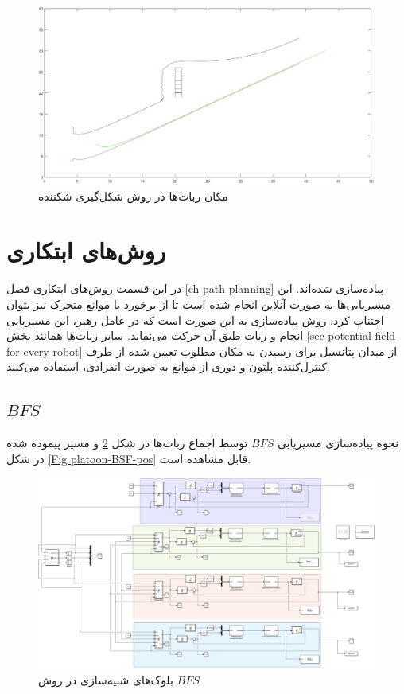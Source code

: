 \begin{figure}[!h]
	\centering
	\includegraphics[scale=0.2]{Images/platoon-potential-field-independent-pos.jpg}
	\caption{مکان ربات‌ها در روش شکل‌گیری شکننده}\label{Fig platoon-potential-field-independent-pos}
\end{figure}



\section{روش‌های ابتکاری}
در این قسمت روش‌های ابتکاری فصل \ref{ch path planning} پیاده‌سازی شده‌اند. این مسیریابی‌ها به صورت آنلاین انجام شده است تا از برخورد با موانع متحرک نیز بتوان اجتناب کرد. روش پیاده‌سازی به این صورت است که در عامل رهبر، این مسیریابی انجام و ربات طبق آن حرکت می‌نماید. سایر ربات‌ها همانند بخش \ref{sec potential-field for every robot} از میدان پتانسیل برای رسیدن به مکان مطلوب تعیین شده از طرف کنترل‌کننده پلتون و دوری از موانع به صورت انفرادی، استفاده می‌کنند.

\subsection{$BFS$}
نحوه پیاده‌سازی مسیریابی $BFS$ توسط اجماع ربات‌ها در شکل \ref{Fig platoon-BSF-simulink} و مسیر پیموده شده در شکل \ref{Fig platoon-BSF-pos} قابل مشاهده است.
\begin{figure}[!h]
	\centering
	\includegraphics[scale=0.22]{Images/platoon-BFS-simulink.png}
	\caption{بلوک‌های شبیه‌سازی در روش $BFS$}\label{Fig platoon-BSF-simulink}
\end{figure}

